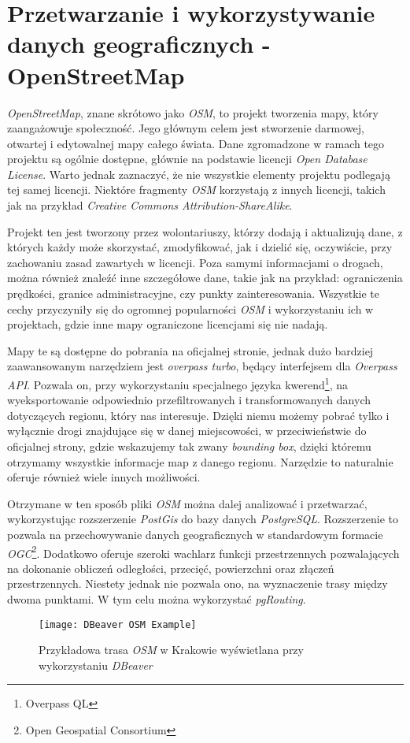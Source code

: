 \section{Przetwarzanie i wykorzystywanie danych geograficznych - OpenStreetMap}

\par \emph{OpenStreetMap}, znane skrótowo jako \emph{OSM}, to projekt tworzenia mapy, który zaangażowuje społeczność. Jego głównym celem jest stworzenie darmowej, otwartej i edytowalnej mapy całego świata. Dane zgromadzone w ramach tego projektu są ogólnie dostępne, głównie na podstawie licencji \emph{Open Database License}. Warto jednak zaznaczyć, że nie wszystkie elementy projektu podlegają tej samej licencji. Niektóre fragmenty \emph{OSM} korzystają z innych licencji, takich jak na przykład \emph{Creative Commons Attribution-ShareAlike}.

\par Projekt ten jest tworzony przez wolontariuszy, którzy dodają i aktualizują dane, z których każdy może skorzystać, zmodyfikować, jak i dzielić się, oczywiście, przy zachowaniu zasad zawartych w licencji. Poza samymi informacjami o drogach, można również znaleźć inne szczegółowe dane, takie jak na przykład: ograniczenia prędkości, granice administracyjne, czy punkty zainteresowania. Wszystkie te cechy przyczyniły się do ogromnej popularności \emph{OSM} i wykorzystaniu ich w projektach, gdzie inne mapy ograniczone licencjami się nie nadają.

\par Mapy te są dostępne do pobrania na oficjalnej stronie\cite{OPEN_STREET_MAPS_SITE}, jednak dużo bardziej zaawansowanym narzędziem jest \emph{overpass turbo}\cite{OVERPASS_TURBO_SITE}, będący interfejsem dla \emph{Overpass API}. Pozwala on, przy wykorzystaniu specjalnego języka kwerend\footnote{Overpass QL}, na wyeksportowanie odpowiednio przefiltrowanych i transformowanych danych dotyczących regionu, który nas interesuje. Dzięki niemu możemy pobrać tylko i wyłącznie drogi znajdujące się w danej miejscowości, w przeciwieństwie do oficjalnej strony, gdzie wskazujemy  tak zwany \emph{bounding box}, dzięki któremu otrzymamy wszystkie informacje map z danego regionu. Narzędzie to naturalnie oferuje również wiele innych możliwości.

\par Otrzymane w ten sposób pliki \emph{OSM} można dalej analizować i przetwarzać, wykorzystując rozszerzenie \emph{PostGis}\cite{POSTGIS_SITE} do bazy danych \emph{PostgreSQL}\cite{POSTGRESQL_SITE}. Rozszerzenie to pozwala na przechowywanie danych geograficznych w standardowym formacie \emph{OGC}\footnote{Open Geospatial Consortium}. Dodatkowo oferuje szeroki wachlarz funkcji przestrzennych pozwalających na dokonanie obliczeń odległości, przecięć, powierzchni oraz złączeń przestrzennych. Niestety jednak nie pozwala ono, na wyznaczenie trasy między dwoma punktami. W tym celu można wykorzystać \emph{pgRouting}\cite{PGROUTING_SITE}.

\begin{figure}
    \centering
    \texttt{[image: DBeaver OSM Example]}
    \caption{Przykładowa trasa \emph{OSM} w Krakowie wyświetlana przy wykorzystaniu \emph{DBeaver}}
    \label{fig:dbeaverOSMExample}
\end{figure}